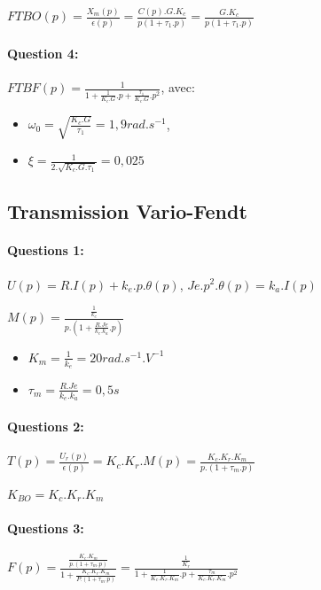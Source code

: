 $FTBO(p)=\frac{X_m(p)}{\epsilon (p)}=\frac{C(p).G.K_c}{p(1+\tau_1.p)}=\frac{G.K_c}{p(1+\tau_1.p)}$

\paragraph{Question 4:}

$FTBF(p)=\frac{1}{1+\frac{1}{K_c.G}.p+\frac{\tau_1}{K_c.G}.p^2}$, avec:

\begin{itemize}
 \item $\omega_0=\sqrt{\frac{K_c.G}{\tau_1}}=1,9rad.s^{-1}$,
 \item $\xi=\frac{1}{2.\sqrt{K_c.G.\tau_1}}=0,025$
\end{itemize}

\subsection{Transmission Vario-Fendt}

\paragraph{Questions 1:}

$U(p)=R.I(p)+k_e.p.\theta(p)$, $Je.p^2.\theta(p)=k_a.I(p)$

$M(p)=\frac{\frac{1}{k_e}}{p.(1+\frac{R.Je}{k_e.k_a}.p)}$

\begin{itemize}
 \item $K_m=\frac{1}{k_e}=20rad.s^{-1}.V^{-1}$
 \item $\tau_m=\frac{R.Je}{k_e.k_a}=0,5s$
\end{itemize}

\paragraph{Questions 2:}

$T(p)=\frac{U_r(p)}{\epsilon(p)}=K_c.K_r.M(p)=\frac{K_c.K_r.K_m}{p.(1+\tau_m.p)}$

$K_{BO}=K_c.K_r.K_m$

\paragraph{Questions 3:}

$F(p)=\frac{\frac{K_c.K_m}{p.(1+\tau_m.p)}}{1+\frac{K_c.K_r.K_m}{P.(1+\tau_m.p)}}=\frac{\frac{1}{K_r}}{1+\frac{1}{K_c.K_r.K_m}.p+\frac{\tau_m}{K_c.K_r.K_m}.p^2}$

